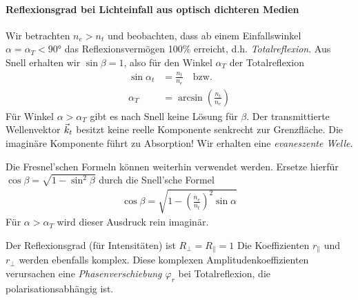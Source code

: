 


\paragraph{Reflexionsgrad bei Lichteinfall aus optisch dichteren
  Medien}
Wir betrachten $n_e>n_t$ und beobachten, dass ab einem
Einfallswinkel $\alpha=\alpha_T<\ang{90}$ das Reflexionsvermögen
100\% erreicht, d.h. \emph{Totalreflexion}.
Aus Snell erhalten wir $\sin\beta = 1$, also für den Winkel
$\alpha_T$%
der Totalreflexion
\begin{align*}
  \sin\alpha_t &= \frac{n_t}{n_e} \quad\text{bzw.}\\
  \alpha_T &= \arcsin(\frac{n_t}{n_e})
\end{align*}
Für Winkel $\alpha>\alpha_T$ gibt es nach Snell keine Lösung
für $\beta$. Der transmittierte Wellenvektor $\vec{k}_t$ besitzt
keine reelle Komponente senkrecht zur Grenzfläche.
Die imaginäre Komponente führt zu Absorption! Wir erhalten eine
\emph{evaneszente Welle}.

Die Fresnel'schen Formeln können weiterhin verwendet
werden. Ersetze hierfür $\cos\beta = \sqrt{1-\sin^2\beta}$ durch
die Snell'sche Formel
\begin{gather*}
  \cos\beta = \sqrt{
    1 - \left(\frac{n_e}{n_t}\right)^2 \sin\alpha
  }
\end{gather*}
Für $\alpha>\alpha_T$ wird dieser Ausdruck rein imaginär.

Der Reflexionsgrad (für Intensitäten) ist $R_\bot=R_\parallel=1$
Die Koeffizienten $r_\parallel$ und $r_\bot$ werden ebenfalls komplex.
Diese komplexen Amplitudenkoeffizienten verursachen eine
\emph{Phasenverschiebung $\varphi_r$}
bei Totalreflexion, die polarisationsabhängig ist.

